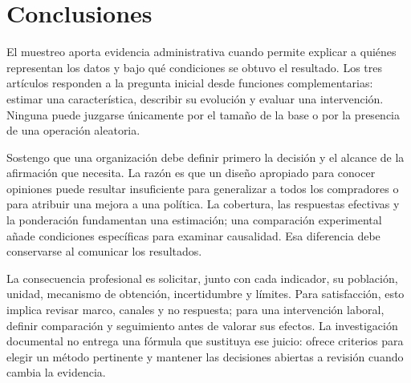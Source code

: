 {\section{Conclusiones}
El muestreo aporta evidencia administrativa cuando permite explicar a quiénes representan los datos y bajo qué condiciones se obtuvo el resultado. Los tres artículos responden a la pregunta inicial desde funciones complementarias: estimar una característica, describir su evolución y evaluar una intervención. Ninguna puede juzgarse únicamente por el tamaño de la base o por la presencia de una operación aleatoria.

Sostengo que una organización debe definir primero la decisión y el alcance de la afirmación que necesita. La razón es que un diseño apropiado para conocer opiniones puede resultar insuficiente para generalizar a todos los compradores o para atribuir una mejora a una política. La cobertura, las respuestas efectivas y la ponderación fundamentan una estimación; una comparación experimental añade condiciones específicas para examinar causalidad. Esa diferencia debe conservarse al comunicar los resultados.

La consecuencia profesional es solicitar, junto con cada indicador, su población, unidad, mecanismo de obtención, incertidumbre y límites. Para satisfacción, esto implica revisar marco, canales y no respuesta; para una intervención laboral, definir comparación y seguimiento antes de valorar sus efectos. La investigación documental no entrega una fórmula que sustituya ese juicio: ofrece criterios para elegir un método pertinente y mantener las decisiones abiertas a revisión cuando cambia la evidencia.

\clearpage

}
\fi

